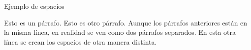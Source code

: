 \documentclass[a4paper,12pt,spanish]{sphinxmanual}
\begin{document}
%
\begin{sphinxVerbatim}[commandchars=\\\{\}]

    Ejemplo de espacios

    Esto es un párrafo.
    Esto es otro párrafo.
        Aunque los párrafos anteriores están en la misma línea, en realidad se ven como dos párrafos separados.
    En esta otra línea se crean los  espacios de otra manera distinta.

\end{sphinxVerbatim}



\renewcommand{\indexname}{Índice}
\printindex
\end{document}
